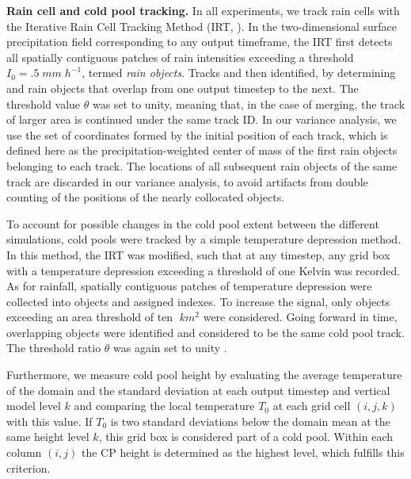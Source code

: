 \documentclass{article}
\begin{document}
\begin{methods}
\noindent
{\bf Rain cell and cold pool tracking.}
In all experiments, we track rain cells with the Iterative Rain Cell Tracking Method (IRT, \cite{moseley2019statistical}).
In the two-dimensional surface precipitation field corresponding to any output timeframe, the IRT first detects all spatially contiguous patches of rain intensities exceeding a threshold $I_0=.5\;mm\;h^{-1}$, termed {\it rain objects}.
Tracks and then identified, by determining and rain objects that overlap from one output timestep to the next. 
The threshold value $\theta$ was set to unity, meaning that, in the case of merging, the track of larger area is continued under the same track ID.
In our variance analysis, we use the set of coordinates formed by the initial position of each track, which is defined here as the precipitation-weighted center of mass of the first rain objects belonging to each track.
The locations of all subsequent rain objects of the same track are discarded in our variance analysis, to avoid artifacts from double counting of the positions of the nearly collocated objects.

To account for possible changes in the cold pool extent between the different simulations, cold pools were tracked by a simple temperature depression method.
In this method, the IRT was modified, such that at any timestep, any grid box with a temperature depression exceeding a threshold of one Kelvin was recorded.
As for rainfall, spatially contiguous patches of temperature depression were collected into objects and assigned indexes.
To increase the signal, only objects exceeding an area threshold of ten $\;km^2$ were considered.
Going forward in time, overlapping objects were identified and considered to be the same cold pool track.
The threshold ratio $\theta$ was again set to unity \cite{moseley2019statistical}.

Furthermore, we measure cold pool height by evaluating the average temperature of the domain and the standard deviation at each output timestep and vertical model level $k$ and comparing the local temperature $T_0$ at each grid cell $(i,j,k)$ with this value.
If $T_0$ is two standard deviations below the domain mean at the same height level $k$, this grid box is considered part of a cold pool. 
Within each column $(i,j)$ the CP height is determined as the highest level, which fulfills this criterion.


\end{methods}
\end{document}
